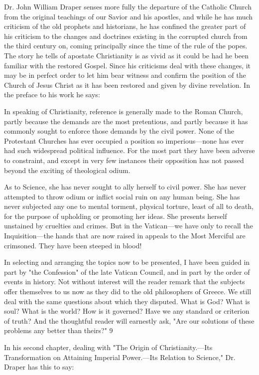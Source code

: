 Dr. John William Draper senses more fully the departure of the Catholic Church from the
original teachings of our Savior and his apostles, and while he has much criticism of the old
prophets and historians, he has confined the greater part of his criticism to the changes and
doctrines existing in the corrupted church from the third century on, coming principally since
the time of the rule of the popes. The story he tells of apostate Christianity is as vivid as it
could be had he been familiar with the restored Gospel. Since his criticisms deal with these
changes, it may be in perfect order to let him bear witness and confirm the position of the
Church of Jesus Christ as it has been restored and given by divine revelation. In the preface
to his work he says:

In speaking of Christianity, reference is generally made to the Roman Church, partly because
the demands are the most pretentious, and partly because it has commonly sought to enforce
those demands by the civil power. None of the Protestant Churches has ever occupied a
position so imperious—none has ever had such widespread political influence. For the most
part they have been adverse to constraint, and except in very few instances their opposition
has not passed beyond the exciting of theological odium.

As to Science, she has never sought to ally herself to civil power. She has never attempted to
throw odium or inflict social ruin on any human being. She has never subjected any one to
mental torment, physical torture, least of all to death, for the purpose of upholding or
promoting her ideas. She presents herself unstained by cruelties and crimes. But in the
Vatican—we have only to recall the Inquisition—the hands that are now raised in appeals to
the Most Merciful are crimsoned. They have been steeped in blood!

In selecting and arranging the topics now to be presented, I have been guided in part by "the
Confession" of the late Vatican Council, and in part by the order of events in history. Not
without interest will the reader remark that the subjects offer themselves to us now as they
did to the old philosophers of Greece. We still deal with the same questions about which they
disputed. What is God? What is soul? What is the world? How is it governed? Have we any
standard or criterion of truth? And the thoughtful reader will earnestly ask, "Are our solutions
of these problems any better than theirs?" 9

In his second chapter, dealing with "The Origin of Christianity.—Its Transformation on
Attaining Imperial Power.—Its Relation to Science," Dr. Draper has this to say:

